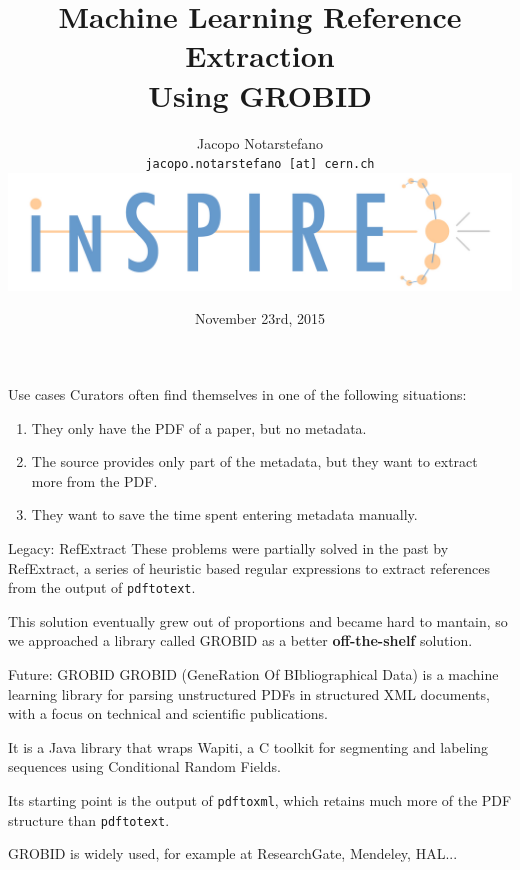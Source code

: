 \documentclass[10pt]{beamer}
\title{
  Machine Learning Reference Extraction\\
  Using GROBID
}
\author[Jacopo Notarstefano]{
  Jacopo Notarstefano\\
  \texttt{jacopo.notarstefano [at] cern.ch}\\
  \vspace{0.25cm}
  \includegraphics[scale=0.25]{tex/img/inspire}
}
\date{November 23rd, 2015}
\newcommand{\cpp}{C\nolinebreak\hspace{-.05em}\raisebox{.4ex}{\tiny\bf +}\nolinebreak\hspace{-.10em}\raisebox{.4ex}{\tiny\bf +}}
\begin{document}
  \begin{frame}[plain]
    \titlepage
  \end{frame}

  \begin{frame}{Use cases}
    Curators often find themselves in one of the following situations:

    \vspace{0.5cm}

    \begin{enumerate}
      \item They only have the PDF of a paper, but no metadata.
      \item The source provides only part of the metadata, but they want to extract more from the PDF.
      \item They want to save the time spent entering metadata manually.
    \end{enumerate}
  \end{frame}

  \begin{frame}{Legacy: RefExtract}
    These problems were partially solved in the past by RefExtract, a series of
    heuristic based regular expressions to extract references from the output
    of \texttt{pdftotext}.

    \vspace{0.5cm}

    This solution eventually grew out of proportions and became hard to mantain, so
    we approached a library called GROBID as a better \textbf{off-the-shelf} solution.
  \end{frame}

  \begin{frame}{Future: GROBID}
    GROBID (GeneRation Of BIbliographical Data) is a machine learning library for parsing
    unstructured PDFs in structured XML documents, with a focus on technical and scientific
    publications.

    \vspace{0.5cm}

    It is a Java library that wraps Wapiti, a \cpp\xspace toolkit for segmenting and
    labeling sequences using Conditional Random Fields.

    \vspace{0.25cm}

    Its starting point is the output of \texttt{pdftoxml}, which retains much more of
    the PDF structure than \texttt{pdftotext}.

    \vspace{0.5cm}

    GROBID is widely used, for example at ResearchGate, Mendeley, HAL...
  \end{frame}
\end{document}
